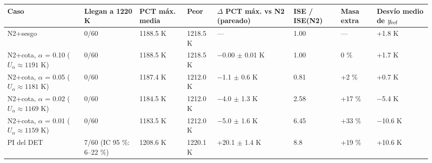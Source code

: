 \documentclass[11pt,a4paper]{article}
\begin{document}
{\footnotesize
\begin{xltabular}{\linewidth}{@{}YYYYYYYY@{}}
\toprule
\textbf{Caso} & \textbf{Llegan a 1220 K} & \textbf{PCT máx. media} & \textbf{Peor} & \textbf{$\Delta$ PCT máx. vs N2 (pareado)} & \textbf{ISE / ISE(N2)} & \textbf{Masa extra} & \textbf{Desvío medio de $y_{\rm ref}$} \\
\midrule
\endhead
N2+sesgo & 0/60 & 1188.5 K & 1218.5 K & — & 1.00 & — & +1.8 K \\
N2+cota, $\alpha$ = 0.10 ($U_\alpha\approx1191$ K) & 0/60 & 1188.5 K & 1218.5 K & $-$0.00 $\pm$ 0.01 K & 1.00 & 0 \% & +1.7 K \\
N2+cota, $\alpha$ = 0.05 ($U_\alpha\approx1181$ K) & 0/60 & 1187.4 K & 1212.0 K & $-$1.1 $\pm$ 0.6 K & 0.81 & +2 \% & +0.7 K \\
N2+cota, $\alpha$ = 0.02 ($U_\alpha\approx1169$ K) & 0/60 & 1184.5 K & 1212.0 K & $-$4.0 $\pm$ 1.3 K & 2.58 & +17 \% & $-$5.4 K \\
N2+cota, $\alpha$ = 0.01 ($U_\alpha\approx1159$ K) & 0/60 & 1183.5 K & 1212.0 K & $-$5.0 $\pm$ 1.6 K & 6.45 & +33 \% & $-$10.6 K \\
PI del DET & 7/60 (IC 95 \%: 6–22 \%) & 1208.6 K & 1220.1 K & +20.1 $\pm$ 1.4 K & 8.8 & +19 \% & +10.6 K \\
\bottomrule
\end{xltabular}}
\end{document}
